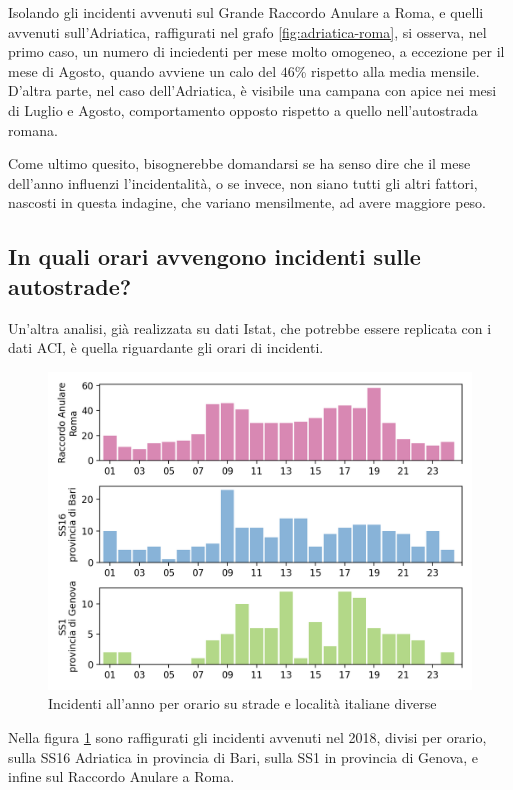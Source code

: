 \documentclass[a4paper,12pt]{report}
\begin{document}
Isolando gli incidenti avvenuti sul Grande Raccordo Anulare a Roma, e quelli avvenuti 
sull'Adriatica, raffigurati nel grafo \ref{fig:adriatica-roma}, si osserva, 
nel primo caso, un numero di inciedenti per mese molto omogeneo, a eccezione per il 
mese di Agosto, quando avviene un calo del $46$\% rispetto alla media mensile. 
D'altra parte, nel caso dell'Adriatica, è visibile una campana con apice nei 
mesi di Luglio e Agosto, comportamento opposto rispetto a quello nell'autostrada 
romana.

Come ultimo quesito, bisognerebbe domandarsi se ha senso dire che il mese dell'anno 
influenzi l'incidentalità, o se invece, non siano tutti gli altri fattori, 
nascosti in questa indagine, che variano mensilmente, ad avere maggiore peso. 

\subsection{In quali orari avvengono incidenti sulle autostrade?}

Un'altra analisi, già realizzata su dati Istat, che potrebbe essere replicata 
con i dati ACI, è quella riguardante gli orari di incidenti. 

\begin{figure}
    \includegraphics[width=\linewidth]{../src/incidenti/incidenti_aci/orari/orari.png}
    \caption{Incidenti all'anno per orario su strade e località italiane diverse}
    \label{fig:orari-strade-aci}
\end{figure}

Nella figura \ref{fig:orari-strade-aci} sono raffigurati gli incidenti avvenuti 
nel 2018, divisi per orario, sulla SS16 Adriatica in provincia di Bari, sulla SS1 
in provincia di Genova, e infine sul Raccordo Anulare a Roma.
\end{document}
